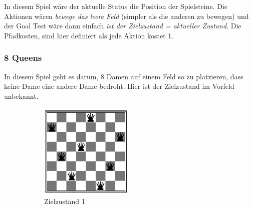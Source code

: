 In diesem Spiel wäre der aktuelle Status die Position der Spielsteine. Die Aktionen wären \textit{bewege das leere Feld} (simpler als die anderen zu bewegen) und der Goal Test wäre dann einfach \textit{ist der Zielzustand = aktueller Zustand}. Die Pfadkosten, sind hier definiert als jede Aktion kostet 1.

\subsubsection{8 Queens}
In diesem Spiel geht es darum, 8 Damen auf einem Feld so zu platzieren, dass keine Dame eine andere Dame bedroht. Hier ist der Zielzustand im Vorfeld unbekannt.
\begin{figure}[h!]
	\centering
	\begin{subfigure}[h]{0.2\textwidth}
	\includegraphics[width=\textwidth]{fig/8_queens_end}
		\caption{Zielzustand 1}
	\end{subfigure}
	~
	\begin{subfigure}[h]{0.2\textwidth}

\end{subfigure}
\end{figure}
